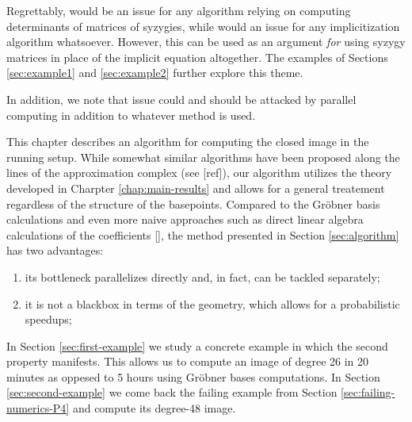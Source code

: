 \documentclass[fleqn,reqno]{amsart}
\newcounter{chapter}
\numberwithin{first}{chapter}
\begin{document}
\begin{paragraf*}
Regrettably,
 would be an issue for any algorithm
relying on computing determinants of matrices of syzygies,
while 
would an issue for any implicitization algorithm whatsoever.
However, this can be used as an argument {\em for}
using syzygy matrices in place of the implicit equation altogether.
The examples of Sections \ref{sec:example1} and \ref{sec:example2} further explore this theme.

In addition, we note that issue 
could and should be attacked by parallel computing in addition to whatever method is used.
\end{paragraf*}



\newpage
[also mention that when $d=e$ this is just solving a system of linear equations for each of the coefficients
of $P(\mathbf x)$. See \citet{Wang2004} for an article devoted to this idea.]

\begin{paragraf*}
This chapter describes an algorithm for computing the closed image in the running setup.
While somewhat similar algorithms have been proposed along the lines of
the approximation complex (see [ref]),
our algorithm utilizes the theory developed in Charpter \ref{chap:main-results}
and allows for a general treatement regardless of the structure of the basepoints.
Compared to the Gr\"obner basis calculations and even more naive approaches
such as direct linear algebra calculations of the coefficients [],
the method presented in Section \ref{sec:algorithm} has two advantages:
\begin{enumerate}
\item
its bottleneck parallelizes directly and, in fact, can be tackled separately;
\item
it is not a blackbox in terms of the geometry, which allows for a probabilistic speedups;
\end{enumerate}

In Section \ref{sec:first-example} we study a concrete example in which the second
property manifests.
This allows us to compute an image of degree 26 in 20 minutes as oppesed to 5 hours
using Gr\"obner bases computations.
In Section \ref{sec:second-example} we come back the failing example from
Section \ref{sec:failing-numerics-P4} and compute its degree-48 image.
\end{paragraf*}
\end{document}

